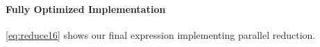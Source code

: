 \paragraph{Fully Optimized Implementation}
\autoref{eq:reduce16} shows our final expression implementing parallel reduction.
